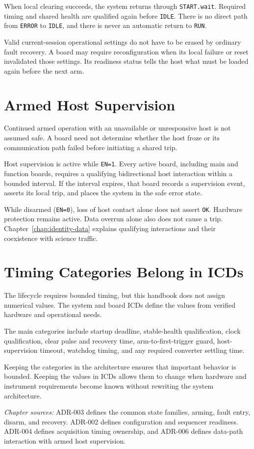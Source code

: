 When local clearing succeeds, the system returns through \texttt{START.wait}. Required timing and shared health are qualified again before \texttt{IDLE}. There is no direct path from \texttt{ERROR} to \texttt{IDLE}, and there is never an automatic return to \texttt{RUN}.

Valid current-session operational settings do not have to be erased by ordinary fault recovery. A board may require reconfiguration when its local failure or reset invalidated those settings. Its readiness status tells the host what must be loaded again before the next arm.

\section{Armed Host Supervision}

Continued armed operation with an unavailable or unresponsive host is not assumed safe. A board need not determine whether the host froze or its communication path failed before initiating a shared trip.

Host supervision is active while \texttt{EN=1}. Every active board, including main and function boards, requires a qualifying bidirectional host interaction within a bounded interval. If the interval expires, that board records a supervision event, asserts its local trip, and places the system in the safe error state.

While disarmed (\texttt{EN=0}), loss of host contact alone does not assert \texttt{OK}. Hardware protection remains active. Data overrun alone also does not cause a trip. Chapter~\ref{chap:identity-data} explains qualifying interactions and their coexistence with science traffic.

\section{Timing Categories Belong in ICDs}

The lifecycle requires bounded timing, but this handbook does not assign numerical values. The system and board ICDs define the values from verified hardware and operational needs.

The main categories include startup deadline, stable-health qualification, clock qualification, clear pulse and recovery time, arm-to-first-trigger guard, host-supervision timeout, watchdog timing, and any required converter settling time.

Keeping the categories in the architecture ensures that important behavior is bounded. Keeping the values in ICDs allows them to change when hardware and instrument requirements become known without rewriting the system architecture.

\medskip
\noindent\textit{Chapter sources:} ADR-003 defines the common state families, arming, fault entry, disarm, and recovery. ADR-002 defines configuration and sequencer readiness. ADR-004 defines acquisition timing ownership, and ADR-006 defines data-path interaction with armed host supervision.
